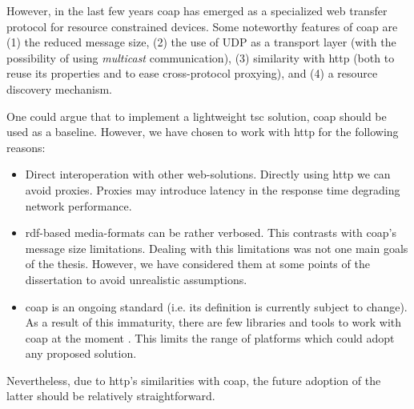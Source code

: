 However, in the last few years \acf{coap}  has emerged as a specialized web transfer protocol for resource constrained devices. %
Some noteworthy features of \ac{coap} are
(1) the reduced message size,
(2) the use of UDP as a transport layer (with the possibility of using \emph{multicast} communication),
(3) similarity with \ac{http} (both to reuse its properties and to ease cross-protocol proxying), and
(4) a resource discovery mechanism. %


One could argue that to implement a lightweight \ac{tsc} solution, \ac{coap} should be used as a baseline.
However, we have chosen to work with \ac{http} for the following reasons:
\begin{itemize}
  \item Direct interoperation with other web-solutions.
        Directly using \ac{http} we can avoid proxies.
        Proxies may introduce latency in the response time degrading network performance. %
  \item \ac{rdf}-based media-formats can be rather verbosed.
	This contrasts with \ac{coap}'s message size limitations.
	Dealing with this limitations was not one main goals of the thesis.
	However, we have considered them at some points of the dissertation to avoid unrealistic assumptions.
  \item \ac{coap} is an ongoing standard (i.e. its definition is currently subject to change).
        As a result of this immaturity, there are few libraries and tools to work with \ac{coap} at the moment \citep{villaverde_constrained_2012}. %
        This limits the range of platforms which could adopt any proposed solution. %
\end{itemize}


Nevertheless, due to \ac{http}'s similarities with \ac{coap}, the future adoption of the latter should be relatively straightforward.

